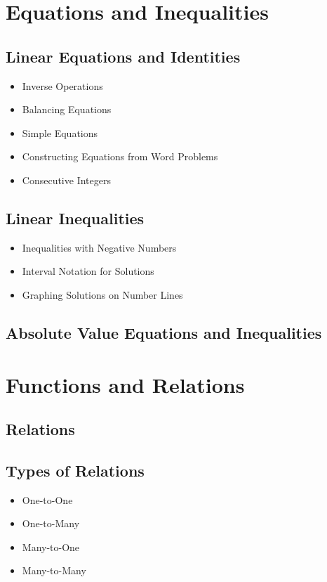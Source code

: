 \documentclass[11pt]{article}
\begin{document}
\setcounter{section}{3}
\section{Equations and Inequalities}
\subsection{Linear Equations and Identities}
\begin{itemize}
    \item Inverse Operations
    \item Balancing Equations
    \item Simple Equations
    \item Constructing Equations from Word Problems
    \item Consecutive Integers
\end{itemize}
\subsection{Linear Inequalities}
\begin{itemize}
    \item Inequalities with Negative Numbers
    \item Interval Notation for Solutions
    \item Graphing Solutions on Number Lines
\end{itemize}
\subsection{Absolute Value Equations and Inequalities}

\setcounter{section}{4}
\section{Functions and Relations}
\subsection{Relations}
\subsection{Types of Relations}
\begin{itemize}
    \item One-to-One
    \item One-to-Many
    \item Many-to-One
    \item Many-to-Many
\end{itemize}
\end{document}
